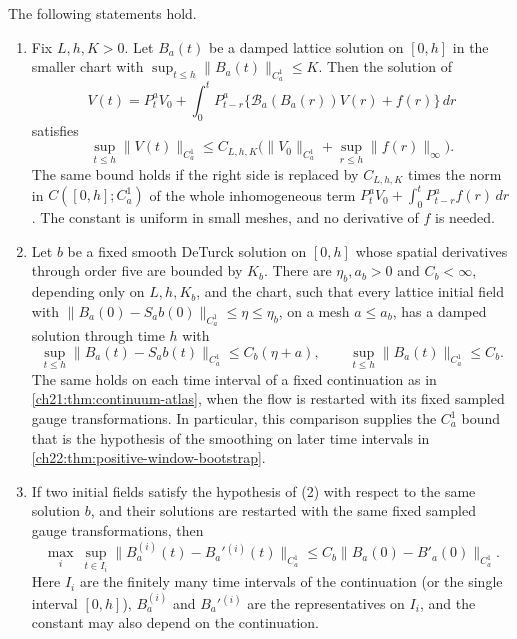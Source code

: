 \begin{lemma}\label{ch22:lem:physical-volterra}
The following statements hold.
\begin{enumerate}
\item Fix $L,h,K>0$. Let $B_a(t)$ be a damped lattice solution on $[0,h]$ in the smaller chart with $\sup_{t\le h}\|B_a(t)\|_{C_a^1}\le K$. Then the solution of
\[
 V(t)=P_t^aV_0+\int_0^tP_{t-r}^a\bigl\{\mathscr B_a(B_a(r))V(r)+f(r)\bigr\}\,dr
\]
satisfies
\begin{equation}\label{ch22:eq:physical-volterra-bound}
 \sup_{t\le h}\|V(t)\|_{C_a^1}\le C_{L,h,K}\bigl(\|V_0\|_{C_a^1}+\sup_{r\le h}\|f(r)\|_\infty\bigr).
\end{equation}
The same bound holds if the right side is replaced by $C_{L,h,K}$ times the norm in $C([0,h];C^1_a)$ of the whole inhomogeneous term $P_t^aV_0+\int_0^tP^a_{t-r}f(r)\,dr$. The constant is uniform in small meshes, and no derivative of $f$ is needed.
\item Let $b$ be a fixed smooth DeTurck solution on $[0,h]$ whose spatial derivatives through order five are bounded by $K_b$. There are $\eta_b,a_b>0$ and $C_b<\infty$, depending only on $L,h,K_b$, and the chart, such that every lattice initial field with $\|B_a(0)-S_ab(0)\|_{C_a^1}\le\eta\le\eta_b$, on a mesh $a\le a_b$, has a damped solution through time $h$ with
\begin{equation}\label{ch22:eq:reference-C1-stability}
 \sup_{t\le h}\|B_a(t)-S_ab(t)\|_{C_a^1}\le C_b(\eta+a),\qquad
 \sup_{t\le h}\|B_a(t)\|_{C_a^1}\le C_b .
\end{equation}
The same holds on each time interval of a fixed continuation as in \cref{ch21:thm:continuum-atlas}, when the flow is restarted with its fixed sampled gauge transformations. In particular, this comparison supplies the $C^1_a$ bound that is the hypothesis of the smoothing on later time intervals in \cref{ch22:thm:positive-window-bootstrap}.
\item If two initial fields satisfy the hypothesis of (2) with respect to the same solution $b$, and their solutions are restarted with the same fixed sampled gauge transformations, then
\begin{equation}\label{ch22:eq:paired-C1-stability}
 \max_i\ \sup_{t\in I_i}\|B_a^{(i)}(t)-B_a'{}^{(i)}(t)\|_{C_a^1}\le C_b\|B_a(0)-B'_a(0)\|_{C_a^1}.
\end{equation}
Here $I_i$ are the finitely many time intervals of the continuation (or the single interval $[0,h]$), $B_a^{(i)}$ and $B_a'{}^{(i)}$ are the representatives on $I_i$, and the constant may also depend on the continuation.

\end{enumerate}
\end{lemma}
